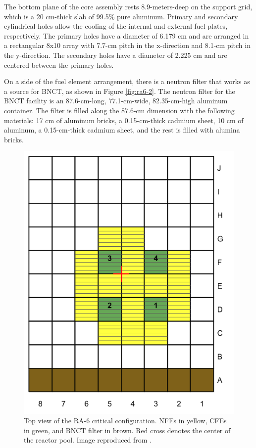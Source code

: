 \documentclass{style/nseJournal}
\begin{document}
The bottom plane of the core assembly rests 8.9-meters-deep on the support grid, which is a 20 cm-thick slab of 99.5\% pure aluminum.
Primary and secondary cylindrical holes allow the cooling of the internal and external fuel plates, respectively.
The primary holes have a diameter of 6.179 cm and are arranged in a rectangular 8x10 array with 7.7-cm pitch in the x-direction and 8.1-cm pitch in the y-direction.
The secondary holes have a diameter of 2.225 cm and are centered between the primary holes.

On a side of the fuel element arrangement, there is a neutron filter that works as a source for \gls*{BNCT}, as shown in Figure \ref{fig:ra6-2}.
The neutron filter for the \gls*{BNCT} facility is an 87.6-cm-long, 77.1-cm-wide, 82.35-cm-high aluminum container.
The filter is filled along the 87.6-cm dimension with the following materials: 17 cm of aluminum bricks, a 0.15-cm-thick cadmium sheet, 10 cm of aluminum, a 0.15-cm-thick cadmium sheet, and the rest is filled with alumina bricks.

\begin{figure}[htbp!] %
    \centering
    \includegraphics[width=0.55\linewidth]{figures/ra6_core2}
    \hfill
    \caption{Top view of the RA-6 critical configuration. NFEs in yellow, CFEs in green, and BNCT filter in brown. Red cross denotes the center of the reactor pool. Image reproduced from \cite{ICSBEP}.}
    \label{fig:ra6-1}
\end{figure}
\end{document}
